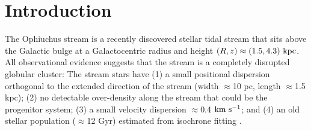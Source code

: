 %

\section{Introduction}\label{sec:introduction}

The Ophiuchus stream \citep{bernard14, sesar15a} is a recently discovered
stellar tidal stream that sits above the Galactic bulge at a Galactocentric
radius and height $(R,z) \approx (1.5, 4.3)~{\rm kpc}$. All observational
evidence suggests that the stream is a completely disrupted globular cluster:
The stream stars have (1) a small positional dispersion orthogonal to the
extended direction of the stream (width $\approx$10 pc, length $\approx$1.5
kpc); (2) no detectable over-density along the stream that could be the
progenitor system; (3) a small velocity dispersion $\approx$0.4 ${\rm km}~{\rm
s}^{-1}$; and (4) an old stellar population ($\approx$12 Gyr) estimated from
isochrone fitting \citep[][hereafter S15]{sesar15a}.

